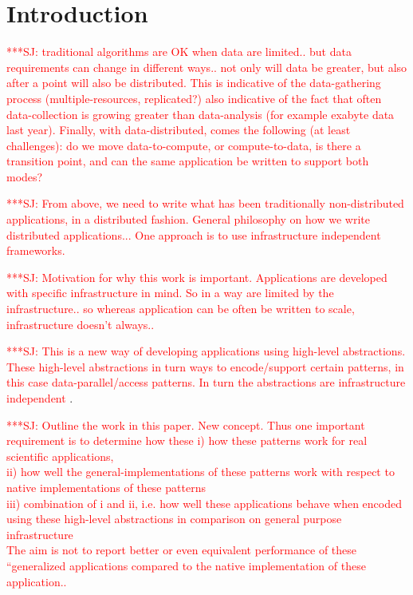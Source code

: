 \documentclass[conference,final]{IEEEtran}
\newcommand{\jhanote}[1]{ {\textcolor{red} { ***SJ: #1 }}}
\newcommand{\jhanote}[1]{}
\begin{document}
\section{Introduction} 

\jhanote{traditional algorithms are OK when data are limited.. but
  data requirements can change in different ways.. not only will data
  be greater, but also after a point will also be distributed. This is
  indicative of the data-gathering process (multiple-resources,
  replicated?) also indicative of the fact that often data-collection
  is growing greater than data-analysis (for example exabyte data last
  year).  Finally, with data-distributed, comes the following (at
  least challenges): do we move data-to-compute, or compute-to-data,
  is there a transition point, and can the same application be written
  to support both modes?}

\jhanote{From above, we need to write what has been traditionally
  non-distributed applications, in a distributed fashion. General
  philosophy on how we write distributed applications... One approach
  is to use infrastructure independent frameworks.}

\jhanote{Motivation for why this work is important. Applications
  are developed with specific infrastructure in mind. So in a
  way are limited by the infrastructure.. so whereas application
  can be often be written to scale, infrastructure doesn't
  always..}

\jhanote{This is a new way of developing applications using high-level
  abstractions. These high-level abstractions in turn ways to
  encode/support certain patterns, in this case data-parallel/access
  patterns. In turn the abstractions are infrastructure independent}.


\jhanote{Outline the work in this paper. New concept. Thus one
  important requirement is to determine how these
  i) how these patterns work for real scientific applications, \\
  ii) how well the general-implementations of these patterns work with
  respect to native implementations of these patterns \\
  iii) combination of i and ii, i.e. how well these applications
  behave when encoded using these high-level abstractions
  in comparison on general purpose infrastructure\\
  The aim is not to report better or even equivalent performance of
  these ``generalized applications compared to the native
  implementation of these application..}
\end{document}
